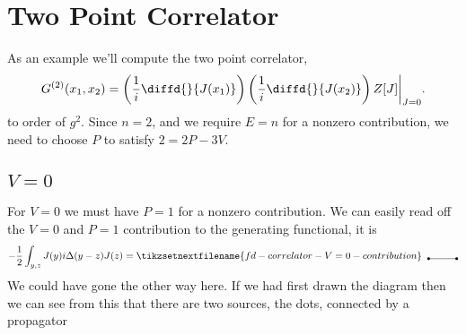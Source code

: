 \documentclass[fleqn]{NotesClass}
\begin{document}
    \section{Two Point Correlator}
    As an example we'll compute the two point correlator, 
    \begin{equation}
        G^{(2)}(x_1, x_2) = \left( \frac{1}{i} \diffd{}{J(x_1)} \right) \left( \frac{1}{i} \diffd{}{J(x_2)} \right) Z[J] \bigg|_{J = 0}.
    \end{equation}
    to order of \(g^2\).
    Since \(n = 2\), and we require \(E = n\) for a nonzero contribution, we need to choose \(P\) to satisfy \(2 = 2P - 3V\).
    
    \subsection{\texorpdfstring{\(V = 0\)}{V = 0}}
    For \(V = 0\) we must have \(P = 1\) for a nonzero contribution.
    We can easily read off the \(V = 0\) and \(P = 1\) contribution to the generating functional, it is
    \begin{equation}
        -\frac{1}{2} \int_{y,z} J(y) i\Delta(y - z) J(z) = 
        \tikzsetnextfilename{fd-correlator-V=0-contribution}
        \begin{tikzpicture}[baseline=(x.base)]
            \draw (0, 0) node[left] (x) {} -- (1, 0);
            \fill (0, 0) circle [radius=0.05cm];
            \fill (1, 0) circle [radius=0.05cm];
        \end{tikzpicture}
    \end{equation}
    We could have gone the other way here.
    If we had first drawn the diagram then we can see from this that there are two sources, the dots, connected by a propagator
    
\end{document}
